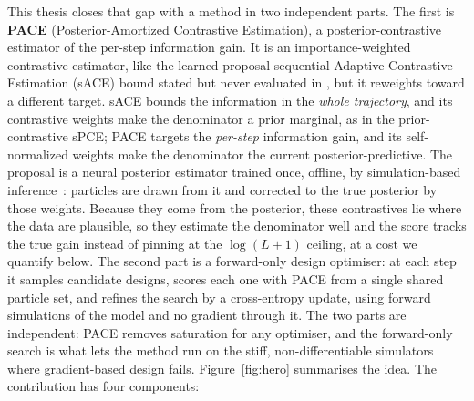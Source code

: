 This thesis closes that gap with a method in two independent parts. The first is \textbf{PACE}
(Posterior-Amortized Contrastive Estimation), a posterior-contrastive estimator of the per-step
information gain. It is an importance-weighted contrastive estimator, like the learned-proposal
sequential Adaptive Contrastive Estimation (sACE) bound stated but never evaluated in \citet{foster2021deep}, but it reweights toward a different
target. sACE bounds the information in the \emph{whole trajectory}, and its contrastive weights
make the denominator a prior marginal, as in the prior-contrastive sPCE; PACE targets the
\emph{per-step} information gain, and its self-normalized weights make the denominator the current
posterior-predictive. The proposal is a neural posterior estimator trained once, offline, by
simulation-based inference~\citep{cranmer2020frontier,greenberg2019automatic,durkan2019neural}:
particles are drawn from it and corrected to the true posterior by those weights. Because they
come from the posterior, these contrastives lie where the data are plausible, so they estimate the
denominator well and the score tracks the true gain instead of pinning at the $\log(L+1)$ ceiling,
at a cost we quantify below. The second part is a forward-only design optimiser: at each step it
samples candidate designs, scores each one with PACE from a single shared particle set, and refines
the search by a cross-entropy update, using forward simulations of the model and no gradient through
it. The two parts are independent: PACE removes saturation for any optimiser, and the forward-only
search is what lets the method run on the stiff, non-differentiable simulators where gradient-based
design fails. Figure~\ref{fig:hero} summarises the idea. The contribution has four components:

